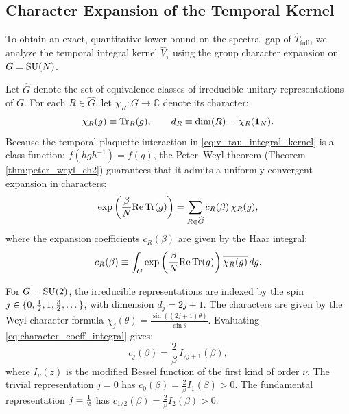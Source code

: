 \subsection{Character Expansion of the Temporal Kernel}
\label{subsec:character_expansion_kernel}

To obtain an exact, quantitative lower bound on the spectral gap of $\hat{T}_{\mathrm{full}}$, we analyze the temporal integral kernel $\hat{V}_\tau$ using the group character expansion on $G = \mathrm{SU}(N)$.

Let $\widehat{G}$ denote the set of equivalence classes of irreducible unitary representations of $G$. For each $R \in \widehat{G}$, let $\chi_R: G \to \mathbb{C}$ denote its character:
\begin{equation}
\chi_R(g) \equiv \mathrm{Tr}_R(g), \qquad d_R \equiv \dim(R) = \chi_R(\mathbf{1}_N).
\end{equation}
Because the temporal plaquette interaction in \eqref{eq:v_tau_integral_kernel} is a class function: $f(h g h^{-1}) = f(g)$, the Peter--Weyl theorem (Theorem \ref{thm:peter_weyl_ch2}) guarantees that it admits a uniformly convergent expansion in characters:
\begin{equation}
\label{eq:character_expansion_wilson}
\exp\left( \frac{\beta}{N} \mathrm{Re} \, \mathrm{Tr}(g) \right) = \sum_{R \in \widehat{G}} c_R(\beta) \, \chi_R(g),
\end{equation}
where the expansion coefficients $c_R(\beta)$ are given by the Haar integral:
\begin{equation}
\label{eq:character_coeff_integral}
c_R(\beta) \equiv \int_G \exp\left( \frac{\beta}{N} \mathrm{Re} \, \mathrm{Tr}(g) \right) \overline{\chi_R(g)} \, dg.
\end{equation}

For $G = \mathrm{SU}(2)$, the irreducible representations are indexed by the spin $j \in \{0, \tfrac{1}{2}, 1, \frac{3}{2}, \dots\}$, with dimension $d_j = 2j+1$. The characters are given by the Weyl character formula $\chi_j(\theta) = \frac{\sin((2j+1)\theta)}{\sin\theta}$. Evaluating \eqref{eq:character_coeff_integral} gives:
\begin{equation}
\label{eq:su2_character_coefficients}
c_j(\beta) = \frac{2}{\beta} \, I_{2j+1}(\beta),
\end{equation}
where $I_\nu(z)$ is the modified Bessel function of the first kind of order $\nu$. The trivial representation $j = 0$ has $c_0(\beta) = \frac{2}{\beta} I_1(\beta) > 0$. The fundamental representation $j = \tfrac{1}{2}$ has $c_{1/2}(\beta) = \frac{2}{\beta} I_2(\beta) > 0$.

